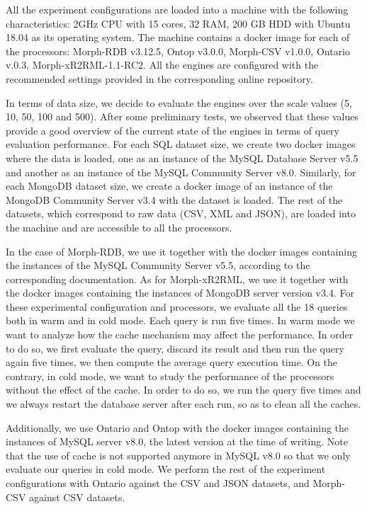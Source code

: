 All the experiment configurations are loaded into a machine with the following characteristics: 2GHz CPU with 15 cores, 32 RAM, 200 GB HDD with Ubuntu 18.04 as its operating system. The machine contains a docker image for each of the processors: Morph-RDB v3.12.5, Ontop v3.0.0, Morph-CSV v1.0.0, Ontario v.0.3, Morph-xR2RML-1.1-RC2. All the engines are configured with the recommended settings provided in the corresponding online repository. 

In terms of data size, we decide to evaluate the engines over the scale values (5, 10, 50, 100 and 500). After some preliminary tests, we observed that these values provide a good overview of the current state of the engines in terms of query evaluation performance. For each SQL dataset size, we create two docker images where the data is loaded, one as an instance of the MySQL Database Server v5.5 and another as an instance of the MySQL Community Server v8.0. Similarly, for each MongoDB dataset size, we create a docker image of an instance of the MongoDB Community Server v3.4 with the dataset is loaded. The rest of the datasets, which correspond to raw data (CSV, XML and JSON), are loaded into the machine and are accessible to all the processors. 

In the case of Morph-RDB, we use it together with the docker images containing the instances of the MySQL Community Server v5.5, according to the corresponding documentation. As for Morph-xR2RML, we use it together with the docker images containing the instances of MongoDB server version v3.4. For these experimental configuration and processors, we evaluate all the 18 queries both in warm and in cold mode. Each query is run five times. In warm mode we want to analyze how the cache mechanism may affect the performance. In order to do so, we first evaluate the query, discard its result and then run  the query again five times, we then compute the average query execution time. On the contrary, in  cold mode, we want to study the performance of the processors without the effect of the cache. In order to do so, we run the query five times and we always restart the database server after each run, so as to clean all the caches. %

Additionally, we use Ontario and Ontop with the docker images containing the instances of MySQL server v8.0, the latest version at the time of writing. Note that the use of cache is not supported anymore in MySQL v8.0 so that we only evaluate our queries in cold mode. We perform the rest of the experiment configurations with Ontario against the CSV and JSON datasets, and Morph-CSV against CSV datasets. 

